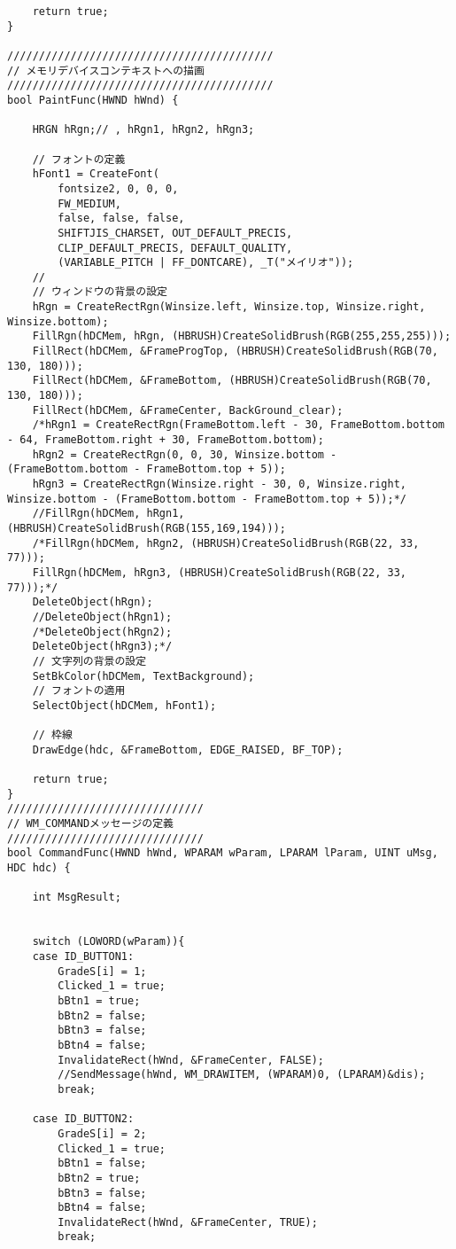 \begin{verbatim}
	return true;
}

//////////////////////////////////////////
// メモリデバイスコンテキストへの描画
//////////////////////////////////////////
bool PaintFunc(HWND hWnd) {

	HRGN hRgn;// , hRgn1, hRgn2, hRgn3;

	// フォントの定義
	hFont1 = CreateFont(
		fontsize2, 0, 0, 0,
		FW_MEDIUM,
		false, false, false,
		SHIFTJIS_CHARSET, OUT_DEFAULT_PRECIS,
		CLIP_DEFAULT_PRECIS, DEFAULT_QUALITY,
		(VARIABLE_PITCH | FF_DONTCARE), _T("メイリオ"));
	//
	// ウィンドウの背景の設定
	hRgn = CreateRectRgn(Winsize.left, Winsize.top, Winsize.right, Winsize.bottom);
	FillRgn(hDCMem, hRgn, (HBRUSH)CreateSolidBrush(RGB(255,255,255)));
	FillRect(hDCMem, &FrameProgTop, (HBRUSH)CreateSolidBrush(RGB(70, 130, 180)));
	FillRect(hDCMem, &FrameBottom, (HBRUSH)CreateSolidBrush(RGB(70, 130, 180)));
	FillRect(hDCMem, &FrameCenter, BackGround_clear);
	/*hRgn1 = CreateRectRgn(FrameBottom.left - 30, FrameBottom.bottom - 64, FrameBottom.right + 30, FrameBottom.bottom);
	hRgn2 = CreateRectRgn(0, 0, 30, Winsize.bottom - (FrameBottom.bottom - FrameBottom.top + 5));
	hRgn3 = CreateRectRgn(Winsize.right - 30, 0, Winsize.right, Winsize.bottom - (FrameBottom.bottom - FrameBottom.top + 5));*/
	//FillRgn(hDCMem, hRgn1, (HBRUSH)CreateSolidBrush(RGB(155,169,194)));
	/*FillRgn(hDCMem, hRgn2, (HBRUSH)CreateSolidBrush(RGB(22, 33, 77)));
	FillRgn(hDCMem, hRgn3, (HBRUSH)CreateSolidBrush(RGB(22, 33, 77)));*/
	DeleteObject(hRgn);
	//DeleteObject(hRgn1);
	/*DeleteObject(hRgn2);
	DeleteObject(hRgn3);*/
	// 文字列の背景の設定
	SetBkColor(hDCMem, TextBackground);
	// フォントの適用
	SelectObject(hDCMem, hFont1);
	
	// 枠線
	DrawEdge(hdc, &FrameBottom, EDGE_RAISED, BF_TOP);

	return true;
}
///////////////////////////////
// WM_COMMANDメッセージの定義
///////////////////////////////
bool CommandFunc(HWND hWnd, WPARAM wParam, LPARAM lParam, UINT uMsg, HDC hdc) {

	int MsgResult;
	

	switch (LOWORD(wParam)){
	case ID_BUTTON1:
		GradeS[i] = 1;
		Clicked_1 = true;
		bBtn1 = true;
		bBtn2 = false;
		bBtn3 = false;
		bBtn4 = false;
		InvalidateRect(hWnd, &FrameCenter, FALSE);
		//SendMessage(hWnd, WM_DRAWITEM, (WPARAM)0, (LPARAM)&dis);
		break;

	case ID_BUTTON2:
		GradeS[i] = 2;
		Clicked_1 = true;
		bBtn1 = false;
		bBtn2 = true;
		bBtn3 = false;
		bBtn4 = false;
		InvalidateRect(hWnd, &FrameCenter, TRUE);
		break;


\end{verbatim}
